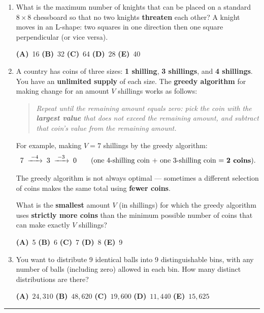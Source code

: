 \documentclass[a4paper,12pt]{article}
\newcommand{\hchoices}[5]{%
  \par\vspace{5pt}%
  \noindent\hspace{2em}%
  \textbf{(A)}~#1\hfill%
  \textbf{(B)}~#2\hfill%
  \textbf{(C)}~#3\hfill%
  \textbf{(D)}~#4\hfill%
  \textbf{(E)}~#5\par%
  \vspace{4pt}%
}
\begin{document}
\begin{enumerate}[label=\textbf{Q\arabic*.},
                  itemsep=3.5ex,
                  leftmargin=3.8em,
                  parsep=0pt]
\hchoices{8}{12}{14}{16}{18}

\item What is the maximum number of knights that can be placed on a standard
$8{\times}8$ chessboard so that no two knights \textbf{threaten} each other?
A knight moves in an L-shape: two squares in one direction then one square
perpendicular (or vice versa).

\hchoices{16}{32}{64}{28}{40}

\item A country has coins of three sizes: \textbf{1 shilling},
\textbf{3 shillings}, and \textbf{4 shillings}. You have an \textbf{unlimited
supply} of each size. The \textbf{greedy algorithm} for making change for an
amount $V$ shillings works as follows:

\begin{quote}\itshape
Repeat until the remaining amount equals zero: pick the coin with the
\textbf{largest value} that does not exceed the remaining amount, and subtract
that coin's value from the remaining amount.
\end{quote}

For example, making $V = 7$ shillings by the greedy algorithm:
\[
  7\;\xrightarrow{\;-4\;}\;3\;\xrightarrow{\;-3\;}\;0
  \qquad\text{(one 4-shilling coin + one 3-shilling coin = \textbf{2 coins}).}
\]

The greedy algorithm is not always optimal --- sometimes a different
selection of coins makes the same total using \textbf{fewer coins}.

What is the \textbf{smallest} amount $V$ (in shillings) for which the greedy
algorithm uses \textbf{strictly more coins} than the minimum possible number
of coins that can make exactly $V$ shillings?

\hchoices{5}{6}{7}{8}{9}

\item You want to distribute 9 identical balls into 9 distinguishable bins,
with any number of balls (including zero) allowed in each bin.
How many distinct distributions are there?

\hchoices{$24{,}310$}{$48{,}620$}{$19{,}600$}{$11{,}440$}{$15{,}625$}

\end{enumerate}

\vspace{2ex}
\hrule
\vspace{2ex}

\end{document}
